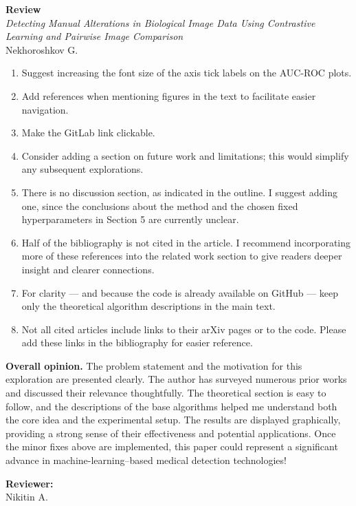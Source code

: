 \documentclass[a4paper,12pt]{article}
\begin{document}
\pagestyle{empty}

\begin{center}
  {\Large\textbf{Review}}\\[1em]
  {\large\textit{Detecting Manual Alterations in Biological Image Data Using Contrastive Learning and Pairwise Image Comparison}}\\[0.5em]
  {Nekhoroshkov G.}
\end{center}

\begin{enumerate}
  \item Suggest increasing the font size of the axis tick labels on the AUC-ROC plots.
  \item Add references when mentioning figures in the text to facilitate easier navigation.
  \item Make the GitLab link clickable.
  \item Consider adding a section on future work and limitations; this would simplify any subsequent explorations.
  \item There is no discussion section, as indicated in the outline. I suggest adding one, since the conclusions about the
        method and the chosen fixed hyperparameters in Section 5 are currently unclear.
  \item Half of the bibliography is not cited in the article. I recommend incorporating more of these references into the
        related work section to give readers deeper insight and clearer connections.
  \item For clarity --- and because the code is already available on GitHub --- keep only the theoretical algorithm descriptions
        in the main text.
  \item Not all cited articles include links to their arXiv pages or to the code. Please add these links in the bibliography
        for easier reference.
\end{enumerate}

\noindent\textbf{Overall opinion.} The problem statement and the motivation for this exploration are presented clearly.
The author has surveyed numerous prior works and discussed their relevance thoughtfully. The theoretical section is easy to
follow, and the descriptions of the base algorithms helped me understand both the core idea and the experimental setup.
The results are displayed graphically, providing a strong sense of their effectiveness and potential applications. Once the
minor fixes above are implemented, this paper could represent a significant advance in machine-learning–based medical
detection technologies!

\begin{flushright}
  \noindent\textbf{Reviewer:}\\
  Nikitin A.
\end{flushright}
\end{document}
